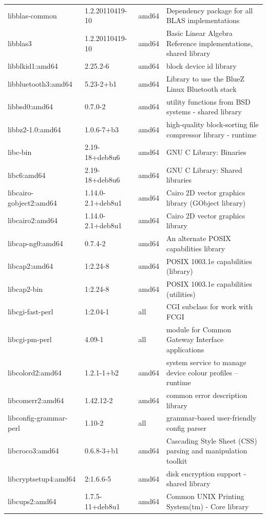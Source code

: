 \documentclass[a4paper,10pt]{article}
\begin{document}
\begin{appendices}
{\begin{longtable}{p{3.25cm}@{\hspace{0.25cm}}p{4cm}@{\hspace{0.25cm}}l@{\hspace{0.25cm}}p{7cm}}
libblas-common	&	1.2.20110419-10	&	amd64	&	Dependency package for all BLAS implementations	\\
libblas3	&	1.2.20110419-10	&	amd64	&	Basic Linear Algebra Reference implementations, shared library	\\
libblkid1:amd64	&	2.25.2-6	&	amd64	&	block device id library	\\
libbluetooth3:amd64	&	5.23-2+b1	&	amd64	&	Library to use the BlueZ Linux Bluetooth stack	\\
libbsd0:amd64	&	0.7.0-2	&	amd64	&	utility functions from BSD systems - shared library	\\
libbz2-1.0:amd64	&	1.0.6-7+b3	&	amd64	&	high-quality block-sorting file compressor library - runtime	\\
libc-bin	&	2.19-18+deb8u6	&	amd64	&	GNU C Library: Binaries	\\
libc6:amd64	&	2.19-18+deb8u6	&	amd64	&	GNU C Library: Shared libraries	\\
libcairo-gobject2:amd64	&	1.14.0-2.1+deb8u1	&	amd64	&	Cairo 2D vector graphics library (GObject library)	\\
libcairo2:amd64	&	1.14.0-2.1+deb8u1	&	amd64	&	Cairo 2D vector graphics library	\\
libcap-ng0:amd64	&	0.7.4-2	&	amd64	&	An alternate POSIX capabilities library	\\
libcap2:amd64	&	1:2.24-8	&	amd64	&	POSIX 1003.1e capabilities (library)	\\
libcap2-bin	&	1:2.24-8	&	amd64	&	POSIX 1003.1e capabilities (utilities)	\\
libcgi-fast-perl	&	1:2.04-1	&	all	&	CGI subclass for work with FCGI	\\
libcgi-pm-perl	&	4.09-1	&	all	&	module for Common Gateway Interface applications	\\
libcolord2:amd64	&	1.2.1-1+b2	&	amd64	&	system service to manage device colour profiles -- runtime	\\
libcomerr2:amd64	&	1.42.12-2	&	amd64	&	common error description library	\\
libconfig-grammar-perl	&	1.10-2	&	all	&	grammar-based user-friendly config parser	\\
libcroco3:amd64	&	0.6.8-3+b1	&	amd64	&	Cascading Style Sheet (CSS) parsing and manipulation toolkit	\\
libcryptsetup4:amd64	&	2:1.6.6-5	&	amd64	&	disk encryption support - shared library	\\
libcups2:amd64	&	1.7.5-11+deb8u1	&	amd64	&	Common UNIX Printing System(tm) - Core library	\\

\end{longtable}}
\end{appendices}
\end{document}

